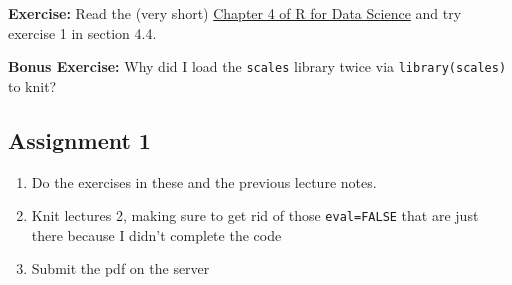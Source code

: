 \documentclass[
]{article}
\providecommand{\tightlist}{%
  \setlength{\itemsep}{0pt}\setlength{\parskip}{0pt}}
\begin{document}
\textbf{Exercise:} Read the (very short)
\href{https://r4ds.had.co.nz/workflow-basics.html}{Chapter 4 of R for
Data Science} and try exercise 1 in section 4.4.

\textbf{Bonus Exercise:} Why did I load the \texttt{scales} library
twice via \texttt{library(scales)} to knit?

\hypertarget{assignment-1}{%
\subsection{Assignment 1}\label{assignment-1}}

\begin{enumerate}
\def\labelenumi{\arabic{enumi}.}
\tightlist
\item
  Do the exercises in these and the previous lecture notes.
\item
  Knit lectures 2, making sure to get rid of those \texttt{eval=FALSE}
  that are just there because I didn't complete the code
\item
  Submit the pdf on the server
\end{enumerate}
\end{document}
